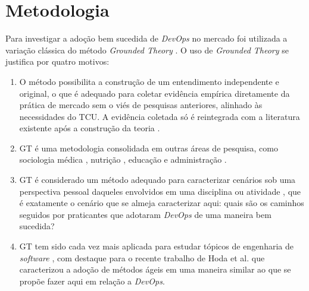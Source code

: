 
\section{Metodologia}

Para investigar a adoção bem sucedida de \textit{DevOps} no mercado foi
utilizada a variação clássica do método \textit{Grounded Theory} \cite{glaser1967discovery}.
O uso de \textit{Grounded Theory} se justifica por quatro motivos:

\begin{enumerate}

\item O método possibilita a construção de um entendimento independente e original,
o que é adequado para coletar evidência empírica diretamente da prática de
mercado sem o viés de pesquisas anteriores, alinhado às necessidades do \acrshort{TCU}.
A evidência coletada só é reintegrada com a literatura existente após a
construção da teoria \cite{reconciling_perspectives,stol2016grounded}.

\item \acrshort{GT} é uma metodologia consolidada em outras áreas de
pesquisa, como sociologia médica \cite{gt_medical_sociology}, nutrição
\cite{gt_nursing}, educação \cite{gt_education} e administração
\cite{gt_management}.

\item \acrshort{GT} é considerado um método adequado para caracterizar cenários
sob uma perspectiva pessoal daqueles envolvidos em uma disciplina ou atividade \cite{stol2016grounded},
que é exatamente o cenário que se almeja caracterizar aqui: quais são os caminhos
seguidos por praticantes que adotaram \textit{DevOps} de uma maneira bem sucedida?

\item \acrshort{GT} tem sido cada vez mais aplicada para estudar tópicos de
engenharia de \textit{software} \cite{hoda2017becoming,Waterman:2015:ICSE,stol2016grounded},
com destaque para o recente trabalho de Hoda et al. \cite{hoda2017becoming} que
caracterizou a adoção de métodos ágeis em uma maneira similar ao que se propõe
fazer aqui em relação a \textit{DevOps}.

\end{enumerate}

